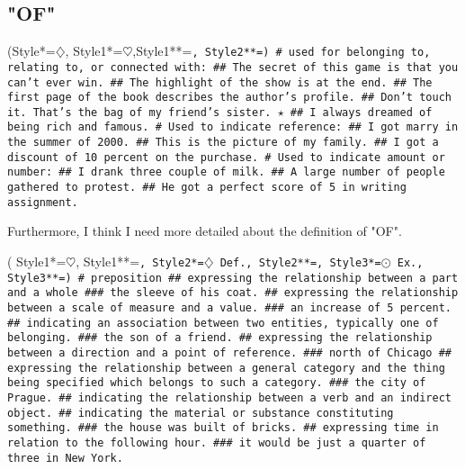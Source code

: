 \subsection{"OF"}
\begin{easylist}[checklist]
\ListProperties(Style*=$\diamondsuit$\quad, Style1*=$\heartsuit$\quad,Style1**=\large\tt\color{google@red}, Style2**=\tt\color{google@blue})
# used for belonging to, relating to, or connected with:
## The secret of this game is that you can't ever win.
## The highlight of the show is at the end.
## The first page of the book describes the author's profile.
## Don't touch it. That's the bag of my friend's sister. $\star$
## I always dreamed of being rich and famous.
# Used to indicate reference:
## I got marry in the summer of 2000.
## This is the picture of my family.
## I got a discount of 10 percent on the purchase.
# Used to indicate amount or number:
## I drank three couple of milk.
## A large number of people gathered to protest.
## He got a perfect score of 5 in writing assignment.
\end{easylist}

\noindent Furthermore, I think I need more detailed about the definition of "OF".
\begin{easylist}[checklist]
\ListProperties( Style1*=$\heartsuit$\quad, Style1**=\Large\tt\color{google@yellow},
                 Style2*={\color{red}\tt$\diamondsuit$ Def.}\quad, Style2**=\tt\color{google@red},
                 Style3*={\color{red}\tt$\odot$ Ex.}\quad, Style3**=\tt\color{google@blue})
# preposition
## \color{red}expressing the relationship between a part and a whole
### the sleeve of his coat.
## expressing the relationship between a scale of measure and a value.
### an increase of 5 percent.
## indicating an association between two entities, typically one of belonging.
### the son of a friend.
## expressing the relationship between a direction and a point of reference.
### north of Chicago
## expressing the relationship between a general category and the thing being 
specified which belongs to such a category.
### the city of Prague.
## indicating the relationship between a verb and an indirect object.
## indicating the material or substance constituting something.
### the house was built of bricks.
## expressing time in relation to the following hour.
### it would be just a quarter of three in New York.
\end{easylist}


